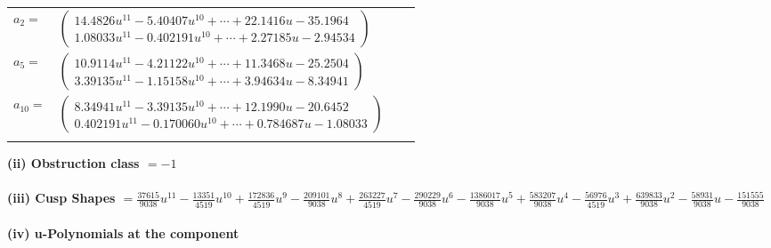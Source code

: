 \documentclass[1p]{elsarticle_modified}
\theoremstyle{definition}
\begin{document}
\begin{tabular}{m{7pt} m{180pt} m{7pt} m{180pt} }
\flushright $a_{2}=$&$\begin{pmatrix}14.4826 u^{11}-5.40407 u^{10}+\cdots+22.1416 u-35.1964\\1.08033 u^{11}-0.402191 u^{10}+\cdots+2.27185 u-2.94534\end{pmatrix}$ \\
\flushright $a_{5}=$&$\begin{pmatrix}10.9114 u^{11}-4.21122 u^{10}+\cdots+11.3468 u-25.2504\\3.39135 u^{11}-1.15158 u^{10}+\cdots+3.94634 u-8.34941\end{pmatrix}$ \\
\flushright $a_{10}=$&$\begin{pmatrix}8.34941 u^{11}-3.39135 u^{10}+\cdots+12.1990 u-20.6452\\0.402191 u^{11}-0.170060 u^{10}+\cdots+0.784687 u-1.08033\end{pmatrix}$\\&\end{tabular}
\flushleft \textbf{(ii) Obstruction class $= -1$}\\~\\
\flushleft \textbf{(iii) Cusp Shapes $= \frac{37615}{9038} u^{11}-\frac{13351}{4519} u^{10}+\frac{172836}{4519} u^9-\frac{209101}{9038} u^8+\frac{263227}{4519} u^7-\frac{290229}{9038} u^6-\frac{1386017}{9038} u^5+\frac{583207}{9038} u^4-\frac{56976}{4519} u^3+\frac{639833}{9038} u^2-\frac{58931}{9038} u-\frac{151555}{9038}$}\\~\\
\newpage\renewcommand{\arraystretch}{1}
\flushleft \textbf{(iv) u-Polynomials at the component}\newline \\
\end{document}
